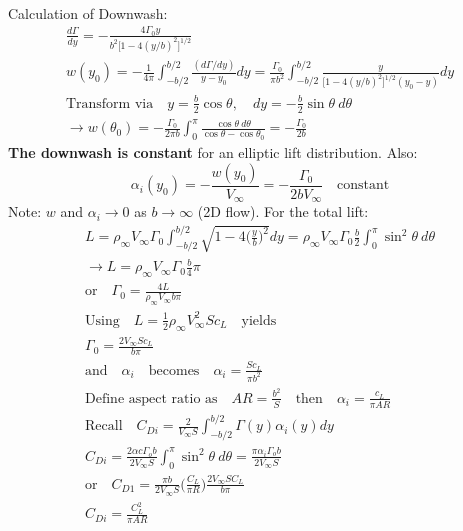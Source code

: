 \documentclass[draft=false, titlepage]{article}
\begin{document}
\paragraph*{} Calculation of Downwash:
\begin{gather*}
    \frac{d\Gamma}{dy} = -\frac{4\Gamma_0 y}{b^2 \big[ 1-4(y/b)^2 \big]^{1/2}}\\
    w(y_0) = -\frac{1}{4\pi} \int_{-b/2}^{b/2} \frac{(d\Gamma/dy)}{y-y_0}dy = \frac{\Gamma_0}{\pi b^2} \int_{-b/2}^{b/2} \frac{y}{\big[ 1-4(y/b)^2 \big]^{1/2} (y_0-y)}dy\\
    \text{Transform via} \quad y = \frac{b}{2}\cos\theta,\quad dy = -\frac{b}{2}\sin\theta\ d\theta\\
    \rightarrow w(\theta_0) = -\frac{\Gamma_0}{2\pi b} \int_0^\pi \frac{\cos\theta\ d\theta}{\cos\theta - \cos\theta_0} = -\frac{\Gamma_0}{2b}
\end{gather*}
\textbf{The downwash is constant} for an elliptic lift distribution. Also:
\begin{equation*}
    \alpha_i(y_0) = -\frac{w(y_0)}{V_\infty} = -\frac{\Gamma_0}{2bV_\infty} \quad \text{constant}
\end{equation*}
Note: $w$ and $\alpha_i \rightarrow 0$ as $b\rightarrow \infty$ (2D flow). For the total lift:
\begin{gather*}
    L = \rho_\infty V_\infty \Gamma_0 \int_{-b/2}^{b/2} \sqrt{1-4\Big(\frac{y}{b}\Big)^2} dy = \rho_\infty V_\infty \Gamma_0 \frac{b}{2} \int_0^\pi \sin^2\theta\ d\theta\\
    \rightarrow  L = \rho_\infty V_\infty \Gamma_0 \frac{b}{4}\pi\\
    \text{or} \quad \Gamma_0 = \frac{4L}{\rho_\infty V_\infty b\pi}\\
    \text{Using} \quad L = \frac{1}{2}\rho_\infty V_\infty^2 Sc_L \quad \text{yields}\\
    \Gamma_0 = \frac{2 V_\infty S c_L}{b\pi}\\
    \text{and} \quad \alpha_i \quad \text{becomes} \quad \alpha_i = \frac{Sc_L}{\pi b^2}\\
    \text{Define aspect ratio as} \quad AR = \frac{b^2}{S} \quad \text{then} \quad \alpha_i = \frac{c_L}{\pi AR}\\
    \text{Recall} \quad C_{Di} = \frac{2}{V_\infty S} \int_{-b/2}^{b/2}\Gamma(y) \alpha_i(y)dy\\
    C_{Di} = \frac{2\alpha c\Gamma_o b}{2V_\infty S}\int_0^\pi \sin^2\theta\ d\theta = \frac{\pi \alpha_i \Gamma_o b}{2V_\infty S}\\
    \text{or} \quad C_{D1} = \frac{\pi b}{2V_\infty S}\Big(\frac{C_L}{\pi R}\Big) \frac{2V_\infty SC_L}{b\pi}\\
    \boxed{C_{Di} = \frac{C_L^2}{\pi AR}}
\end{gather*}
\end{document}
